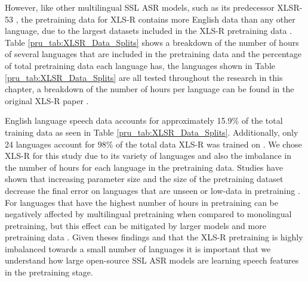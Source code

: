 

However, like other multilingual SSL ASR models, such as its predecessor XLSR-53 \cite{XLSR-53}, the pretraining data for XLS-R contains more English data than any other language, due to the largest datasets included in the XLS-R pretraining data \cite{MLS, wang-etal-2021-voxpopuli}. Table \ref{pru_tab:XLSR_Data_Splits} shows a breakdown of the number of hours of several languages that are included in the pretraining data and the percentage of total pretraining data each language has, the languages shown in Table \ref{pru_tab:XLSR_Data_Splits} are all tested throughout the research in this chapter, a breakdown of the number of hours per language can be found in the original XLS-R paper \cite{babu2021xlsr}.

English language speech data accounts for approximately 15.9\% of the total training data as seen in Table \ref{pru_tab:XLSR_Data_Splits}. Additionally, only 24 languages account for 98\% of the total data XLS-R was trained on \cite{babu2021xlsr}. We chose XLS-R for this study due to its variety of languages and also the imbalance in the number of hours for each language in the pretraining data. Studies have shown that increasing parameter size and the size of the pretraining dataset decrease the final error on languages that are unseen or low-data in pretraining . For languages that have the highest number of hours in pretraining can be negatively affected by multilingual pretraining when compared to monolingual pretraining, but this effect can be mitigated by larger models and more pretraining data \cite{liscalingasru, pratap20c_interspeech}. Given theses findings and that the XLS-R pretraining is highly imbalanced towards a small number of languages it is important that we understand how large open-source SSL ASR models are learning speech features in the pretraining stage.





